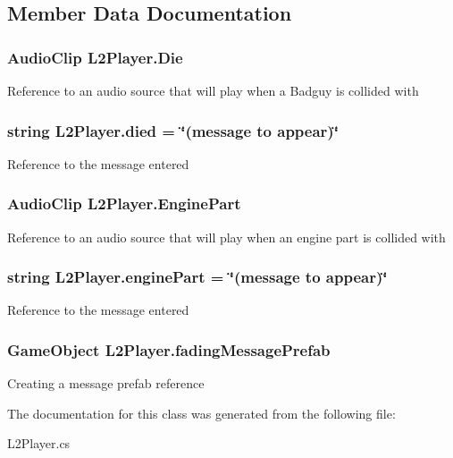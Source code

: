 \subsection{Member Data Documentation}
\hypertarget{class_l2_player_a3fc2b5fdbd62fe694a1f20a6f085a43f}{
\subsubsection[{Die}]{\setlength{\rightskip}{0pt plus 5cm}Audio\-Clip L2\-Player.\-Die}}\label{class_l2_player_a3fc2b5fdbd62fe694a1f20a6f085a43f}
Reference to an audio source that will play when a Badguy is collided with \hypertarget{class_l2_player_a354ec1eb77d1e1bceac1ea9f0205dab9}{
\subsubsection[{died}]{\setlength{\rightskip}{0pt plus 5cm}string L2\-Player.\-died = \char`\"{}(message to appear)\char`\"{}}}\label{class_l2_player_a354ec1eb77d1e1bceac1ea9f0205dab9}
Reference to the message entered \hypertarget{class_l2_player_ae6acf2430aa6da4b449caa58077c1db7}{
\subsubsection[{Engine\-Part}]{\setlength{\rightskip}{0pt plus 5cm}Audio\-Clip L2\-Player.\-Engine\-Part}}\label{class_l2_player_ae6acf2430aa6da4b449caa58077c1db7}
Reference to an audio source that will play when an engine part is collided with \hypertarget{class_l2_player_ac303dbde290736bcbe225855c71e3dc4}{
\subsubsection[{engine\-Part}]{\setlength{\rightskip}{0pt plus 5cm}string L2\-Player.\-engine\-Part = \char`\"{}(message to appear)\char`\"{}}}\label{class_l2_player_ac303dbde290736bcbe225855c71e3dc4}
Reference to the message entered \hypertarget{class_l2_player_ac539a32388cdac6aa327d71b6646727b}{
\subsubsection[{fading\-Message\-Prefab}]{\setlength{\rightskip}{0pt plus 5cm}Game\-Object L2\-Player.\-fading\-Message\-Prefab}}\label{class_l2_player_ac539a32388cdac6aa327d71b6646727b}
Creating a message prefab reference 

The documentation for this class was generated from the following file\-:\begin{DoxyCompactItemize}
\item 
L2\-Player.\-cs\end{DoxyCompactItemize}
